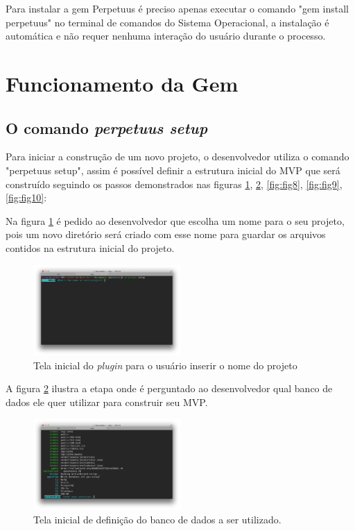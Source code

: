 Para instalar a gem Perpetuus \'e preciso apenas executar o comando "gem install perpetuus" no terminal de comandos do Sistema Operacional, a instala\c{c}\~ao \'e autom\'atica e n\~ao requer nenhuma intera\c{c}\~ao do usu\'ario durante o processo.

\section{Funcionamento da Gem}

\subsection{O comando \emph{perpetuus setup}}

Para iniciar a constru\c{c}\~ao de um novo projeto, o desenvolvedor utiliza o comando "perpetuus setup", assim \'e poss\'ivel definir a estrutura inicial do MVP que ser\'a constru\'ido seguindo os passos demonstrados nas figuras \ref{fig:fig6}, \ref{fig:fig7}, \ref{fig:fig8}, \ref{fig:fig9}, \ref{fig:fig10}:

\pagebreak

Na figura \ref{fig:fig6} \'e pedido ao desenvolvedor que escolha um nome para o seu projeto, pois um novo diret\'orio ser\'a criado com esse nome para guardar os arquivos contidos na estrutura inicial do projeto.

\begin{figure}[h]
  \centering
  \includegraphics[width=0.5\textwidth]{./fig/setup1}
  \caption{Tela inicial do \emph{plugin} para o usu\'ario inserir o nome do projeto}
  \label{fig:fig6}
\end{figure}

A figura \ref{fig:fig7} ilustra a etapa onde \'e perguntado ao desenvolvedor qual banco de dados ele quer utilizar para construir seu MVP.

\begin{figure}[h]
  \centering
  \includegraphics[width=0.5\textwidth]{./fig/setup2}
  \caption{Tela inicial de defini\c{c}\~ao do banco de dados a ser utilizado.}
  \label{fig:fig7}
\end{figure}

